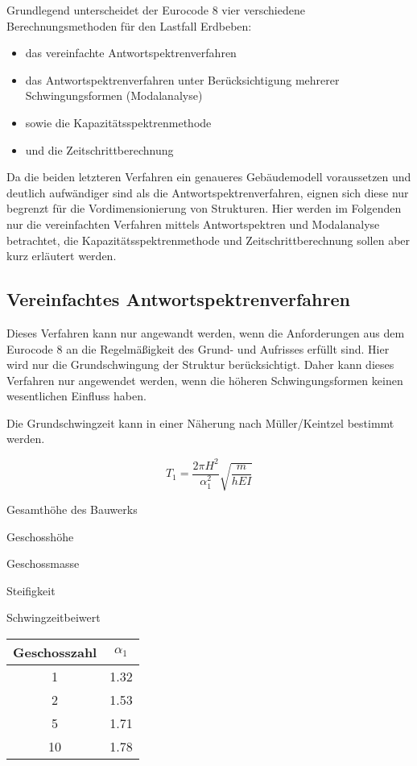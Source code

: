Grundlegend unterscheidet der Eurocode 8 vier verschiedene Berechnungsmethoden für den Lastfall Erdbeben:

\begin{itemize}
  \item das vereinfachte Antwortspektrenverfahren
  \item das Antwortspektrenverfahren unter Berücksichtigung mehrerer Schwingungsformen (Modalanalyse)
  \item sowie die Kapazitätsspektrenmethode
  \item und die Zeitschrittberechnung
\end{itemize}

Da die beiden letzteren Verfahren ein genaueres Gebäudemodell voraussetzen und deutlich aufwändiger sind als die Antwortspektrenverfahren, eignen sich diese nur begrenzt für die Vordimensionierung von Strukturen. 
Hier werden im Folgenden nur die vereinfachten Verfahren mittels Antwortspektren und Modalanalyse betrachtet, die Kapazitätsspektrenmethode und Zeitschrittberechnung sollen aber kurz erläutert werden.

\pagebreak

\subsection{Vereinfachtes Antwortspektrenverfahren}
\label{sec:Antwortspektrenverfahren}

Dieses Verfahren kann nur angewandt werden, wenn die Anforderungen aus dem Eurocode 8 an die Regelmäßigkeit des Grund- und Aufrisses erfüllt sind.
Hier wird nur die Grundschwingung der Struktur berücksichtigt. Daher kann dieses Verfahren nur angewendet werden, wenn die höheren Schwingungsformen keinen wesentlichen Einfluss haben.

Die Grundschwingzeit kann in einer Näherung nach Müller/Keintzel bestimmt werden.

\begin{equation*}
T_1 = \frac{2 \pi H^2}{\alpha_1^2}\sqrt{\frac{m}{hEI}}
\end{equation*}

\thinspace

\begin{multicols}{2}
 Gesamthöhe des Bauwerks \par
{} Geschosshöhe \par
{} Geschossmasse \par
{} Steifigkeit \par 
{} Schwingzeitbeiwert \par
\columnbreak
\begin{flushright}
\begin{tabular}{ |c|c| } 
 \hline
 Geschosszahl & $\alpha_1$ \\
 \hline\hline
 1 & 1.32 \\ 
 2 & 1.53 \\ 
 5 & 1.71 \\ 
 10 & 1.78 \\ 
 \hline
\end{tabular}
\end{flushright}
\end{multicols}

